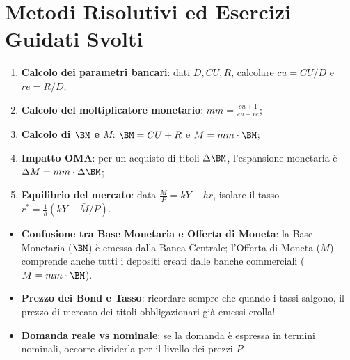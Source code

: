 \section{Metodi Risolutivi ed Esercizi Guidati Svolti}

\begin{metodo}
\begin{enumerate}
    \item \textbf{Calcolo dei parametri bancari}: dati $D, CU, R$, calcolare $cu = CU/D$ e $re = R/D$;
    \item \textbf{Calcolo del moltiplicatore monetario}: $mm = \frac{cu + 1}{cu + re}$;
    \item \textbf{Calcolo di $\BM$ e $M$}: $\BM = CU + R$ e $M = mm \cdot \BM$;
    \item \textbf{Impatto OMA}: per un acquisto di titoli $\Delta \BM$, l'espansione monetaria è $\Delta M = mm \cdot \Delta \BM$;
    \item \textbf{Equilibrio del mercato}: data $\frac{\bar{M}}{P} = kY - hr$, isolare il tasso $r^* = \frac{1}{h}(kY - \bar{M}/P)$.
\end{enumerate}
\end{metodo}

\begin{esame}
\begin{itemize}
    \item \textbf{Confusione tra Base Monetaria e Offerta di Moneta}: la Base Monetaria ($\BM$) è emessa dalla Banca Centrale; l'Offerta di Moneta ($M$) comprende anche tutti i depositi creati dalle banche commerciali ($M = mm \cdot \BM$).
    \item \textbf{Prezzo dei Bond e Tasso}: ricordare sempre che quando i tassi salgono, il prezzo di mercato dei titoli obbligazionari già emessi crolla!
    \item \textbf{Domanda reale vs nominale}: se la domanda è espressa in termini nominali, occorre dividerla per il livello dei prezzi $P$.
\end{itemize}
\end{esame}


